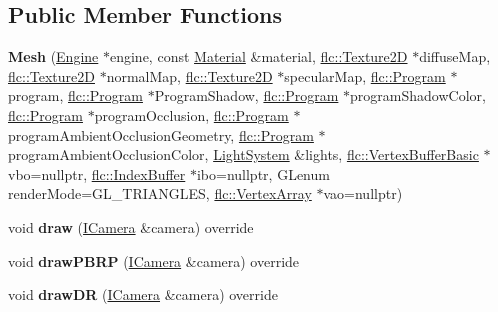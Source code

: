 \subsection*{Public Member Functions}
\begin{DoxyCompactItemize}
\item 
\mbox{\label{classflw_1_1flf_1_1Mesh_a5950330390dbf7d380dd26dac5bea487}} 
{\bfseries Mesh} (\hyperlink{classflw_1_1Engine}{Engine} $\ast$engine, const \hyperlink{classflw_1_1flf_1_1Material}{Material} \&material, \hyperlink{classflw_1_1flc_1_1Texture2D}{flc\+::\+Texture2D} $\ast$diffuse\+Map, \hyperlink{classflw_1_1flc_1_1Texture2D}{flc\+::\+Texture2D} $\ast$normal\+Map, \hyperlink{classflw_1_1flc_1_1Texture2D}{flc\+::\+Texture2D} $\ast$specular\+Map, \hyperlink{classflw_1_1flc_1_1Program}{flc\+::\+Program} $\ast$program, \hyperlink{classflw_1_1flc_1_1Program}{flc\+::\+Program} $\ast$Program\+Shadow, \hyperlink{classflw_1_1flc_1_1Program}{flc\+::\+Program} $\ast$program\+Shadow\+Color, \hyperlink{classflw_1_1flc_1_1Program}{flc\+::\+Program} $\ast$program\+Occlusion, \hyperlink{classflw_1_1flc_1_1Program}{flc\+::\+Program} $\ast$program\+Ambient\+Occlusion\+Geometry, \hyperlink{classflw_1_1flc_1_1Program}{flc\+::\+Program} $\ast$program\+Ambient\+Occlusion\+Color, \hyperlink{classflw_1_1flf_1_1LightSystem}{Light\+System} \&lights, \hyperlink{classflw_1_1flc_1_1VertexBufferBasic}{flc\+::\+Vertex\+Buffer\+Basic} $\ast$vbo=nullptr, \hyperlink{classflw_1_1flc_1_1IndexBuffer}{flc\+::\+Index\+Buffer} $\ast$ibo=nullptr, G\+Lenum render\+Mode=G\+L\+\_\+\+T\+R\+I\+A\+N\+G\+L\+ES, \hyperlink{classflw_1_1flc_1_1VertexArray}{flc\+::\+Vertex\+Array} $\ast$vao=nullptr)
\item 
\mbox{\label{classflw_1_1flf_1_1Mesh_aeaa3f84dd6e5837f13a9cd51c2b88158}} 
void {\bfseries draw} (\hyperlink{classflw_1_1flf_1_1ICamera}{I\+Camera} \&camera) override
\item 
\mbox{\label{classflw_1_1flf_1_1Mesh_ac029b54934debf9c6aa934dd9d3f464b}} 
void {\bfseries draw\+P\+B\+RP} (\hyperlink{classflw_1_1flf_1_1ICamera}{I\+Camera} \&camera) override
\item 
\mbox{\label{classflw_1_1flf_1_1Mesh_ac42a9703abe3a6fedf8ae6423a71848f}} 
void {\bfseries draw\+DR} (\hyperlink{classflw_1_1flf_1_1ICamera}{I\+Camera} \&camera) override

\end{DoxyCompactItemize}
